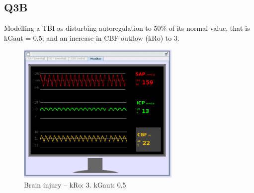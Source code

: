 \subsection*{Q3B}
Modelling a TBI as disturbing autoregulation to 50\% of its normal value, that is kGaut = 0.5; and an increase in CBF outflow (kRo) to 3.
\begin{figure}[h]
    \centering
    \includegraphics[width=0.7\textwidth]{images/Q3B-TBI.png}
    \caption{Brain injury -- kRo: 3. kGaut: 0.5}
\end{figure}

\clearpage


